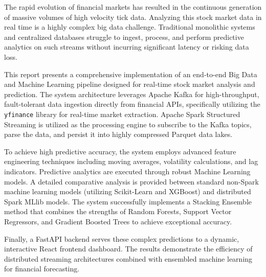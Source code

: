 \documentclass[12pt,a4paper]{report}
\begin{document}

\vspace{0.5cm}

The rapid evolution of financial markets has resulted in the continuous generation of massive volumes of high velocity tick data. Analyzing this stock market data in real time is a highly complex big data challenge. Traditional monolithic systems and centralized databases struggle to ingest, process, and perform predictive analytics on such streams without incurring significant latency or risking data loss. 

This report presents a comprehensive implementation of an end-to-end Big Data and Machine Learning pipeline designed for real-time stock market analysis and prediction. The system architecture leverages Apache Kafka for high-throughput, fault-tolerant data ingestion directly from financial APIs, specifically utilizing the \texttt{yfinance} library for real-time market extraction. Apache Spark Structured Streaming is utilized as the processing engine to subscribe to the Kafka topics, parse the data, and persist it into highly compressed Parquet data lakes. 

To achieve high predictive accuracy, the system employs advanced feature engineering techniques including moving averages, volatility calculations, and lag indicators. Predictive analytics are executed through robust Machine Learning models. A detailed comparative analysis is provided between standard non-Spark machine learning models (utilizing Scikit-Learn and XGBoost) and distributed Spark MLlib models. The system successfully implements a Stacking Ensemble method that combines the strengths of Random Forests, Support Vector Regressors, and Gradient Boosted Trees to achieve exceptional accuracy. 

Finally, a FastAPI backend serves these complex predictions to a dynamic, interactive React frontend dashboard. The results demonstrate the efficiency of distributed streaming architectures combined with ensembled machine learning for financial forecasting.

\clearpage




\tableofcontents
\clearpage
\listoffigures
{}
\clearpage
\listoftables
{}
\clearpage

\setcounter{page}{1}
\setlength{\parindent}{20pt} %
\setlength{\parskip}{1.0em} %
\end{document}
